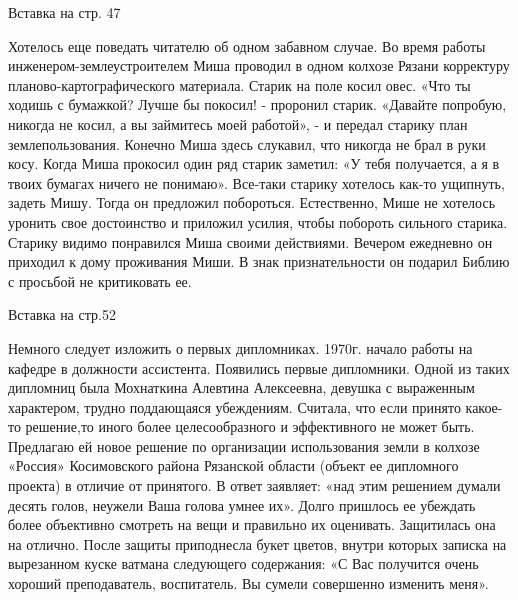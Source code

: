 Вставка на стр. 47

Хотелось еще поведать читателю об одном забавном случае. Во время работы инженером-землеустроителем Миша проводил в одном колхозе Рязани корректуру планово-картографического материала. Старик на поле косил овес. «Что ты ходишь с бумажкой? Лучше бы покосил! - проронил старик. «Давайте попробую, никогда не косил, а вы займитесь моей работой», - и передал старику план землепользования. Конечно Миша здесь слукавил, что никогда не брал в руки косу. Когда Миша прокосил один ряд старик заметил: «У тебя получается, а я в твоих бумагах ничего не понимаю». Все-таки старику хотелось как-то ущипнуть, задеть Мишу. Тогда он предложил побороться. Естественно, Мише не хотелось уронить свое достоинство и приложил усилия, чтобы побороть сильного старика. Старику видимо понравился Миша своими действиями. Вечером ежедневно он приходил к дому проживания Миши. В знак признательности он подарил Библию с просьбой не критиковать ее. 

Вставка на стр.52

Немного следует изложить о первых дипломниках. 1970г. начало работы на кафедре в должности ассистента. Появились первые дипломники. Одной из таких дипломниц была Мохнаткина Алевтина Алексеевна, девушка с выраженным характером, трудно поддающаяся убеждениям. Считала, что если принято какое-то решение,то иного более целесообразного и эффективного не может быть. Предлагаю ей новое решение по организации использования земли в колхозе «Россия» Косимовского района Рязанской области (объект ее дипломного проекта)
 в отличие от принятого. В ответ заявляет: «над этим решением думали десять голов, неужели Ваша голова умнее их». Долго пришлось ее убеждать более объективно смотреть на вещи и правильно их оценивать. Защитилась она на отлично. После защиты приподнесла букет цветов, внутри которых записка на вырезанном куске ватмана следующего содержания: «С Вас получится очень хороший преподаватель, воспитатель. Вы сумели совершенно изменить меня».

